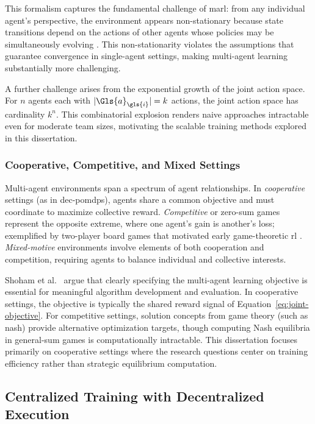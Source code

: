 This formalism captures the fundamental challenge of \gls{marl}:
from any individual agent's perspective, the environment appears
non-stationary because state transitions depend on the actions of other
agents whose policies may be simultaneously evolving \cite{busoniu2008}.
This non-stationarity violates the assumptions that guarantee
convergence in single-agent settings, making multi-agent
learning substantially more challenging.

A further challenge arises from the exponential growth of the joint
action space. For \(n\) agents each with \(|\Gls{a}_{\gls{i}}| = k\) actions,
the joint action space has cardinality \(k^n\). This combinatorial explosion
renders naive approaches intractable even for moderate team sizes,
motivating the scalable training methods explored in this dissertation.

\subsubsection{Cooperative, Competitive, and Mixed Settings}

Multi-agent environments span a spectrum of agent relationships. 
In \textit{cooperative} settings (as in \glspl{dec-pomdp}), agents 
share a common objective and must coordinate to maximize collective reward. 
\textit{Competitive} or zero-sum games represent the opposite extreme, 
where one agent's gain is another's loss; exemplified by two-player 
board games that motivated early game-theoretic \gls{rl} \cite{littman1994}. 
\textit{Mixed-motive} environments involve elements of both cooperation and 
competition, requiring agents to balance individual and collective interests.

Shoham et al.~\cite{shoham2007} argue that clearly specifying the multi-agent 
learning objective is essential for meaningful algorithm development and evaluation. 
In cooperative settings, the objective is typically the shared reward signal of 
Equation~\ref{eq:joint-objective}. For competitive settings, solution concepts from game 
theory (such as \gls{nash}) provide alternative optimization targets, though computing 
Nash equilibria in general-sum games is computationally intractable. This dissertation focuses 
primarily on cooperative settings where the research questions center on training efficiency 
rather than strategic equilibrium computation.


\subsection{Centralized Training with Decentralized Execution}
\label{subsec:ctde}

